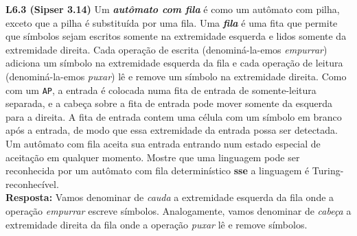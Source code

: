 
\noindent \textbf{L6.3 (Sipser 3.14)} Um \textbf{\textit{autômato com fila}} é como um autômato com pilha, exceto que a pilha é substituída por uma fila. Uma \textbf{\textit{fila}} é uma fita que permite que símbolos sejam escritos somente na extremidade esquerda e lidos somente da extremidade direita. Cada operação de escrita (denominá-la-emos  \textit{empurrar}) adiciona um símbolo na extremidade esquerda da fila e cada operação de leitura (denominá-la-emos  \textit{puxar}) lê e remove um símbolo na extremidade direita. Como com um \texttt{AP}, a entrada é colocada numa fita de entrada de somente-leitura separada, e a cabeça sobre a fita de entrada pode mover somente da esquerda para a direita. A fita de entrada contem uma célula com um símbolo em branco após a entrada, de modo que essa extremidade da entrada possa ser detectada. Um autômato com fila aceita sua entrada entrando num estado especial de aceitação em qualquer momento. Mostre que uma linguagem pode ser reconhecida por um autômato com fila determinístico \textbf{sse} a linguagem é Turing-reconhecível.\\[3pt]
\textbf{Resposta: } Vamos denominar de \textit{cauda} a extremidade esquerda da fila onde a operação \textit{empurrar} escreve símbolos. Analogamente, vamos denominar de \textit{cabeça} a extremidade direita da fila onde a operação \textit{puxar} lê e remove símbolos.

